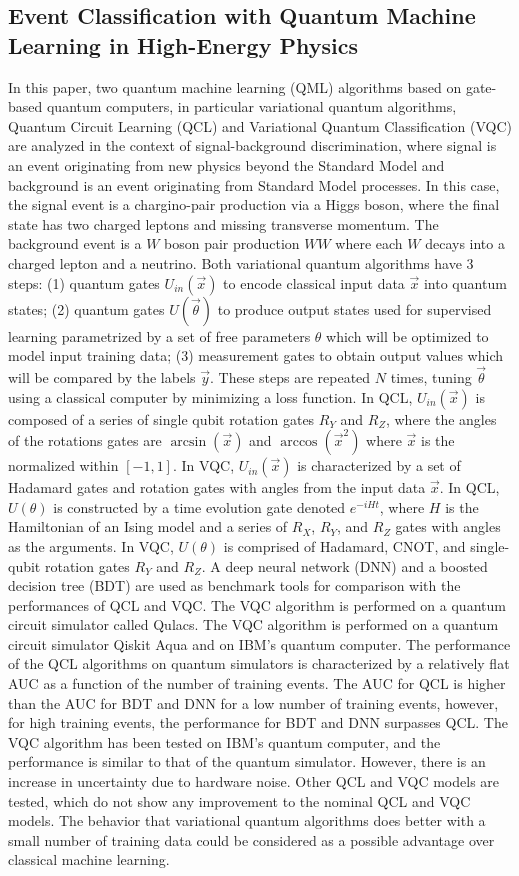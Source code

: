 \subsection{Event Classification with Quantum Machine Learning in High-Energy Physics~\cite{Terashi:2020wfi}}
In this paper, two quantum machine learning (QML) algorithms based on gate-based quantum computers, in particular variational quantum algorithms, Quantum Circuit Learning (QCL) and Variational Quantum Classification (VQC) are analyzed in the context of signal-background discrimination, where signal is an event originating from new physics beyond the Standard Model and background is an event originating from Standard Model processes. In this case, the signal event is a chargino-pair production via a Higgs boson, where the final state has two charged leptons and missing transverse momentum. The background event is a $W$ boson pair production $WW$ where each $W$ decays into a charged lepton and a neutrino. Both variational quantum algorithms have 3 steps: (1) quantum gates $U_{in}(\vec{x})$ to encode classical input data $\vec{x}$ into quantum states; (2) quantum gates $U(\vec{\theta})$ to produce output states used for supervised learning parametrized by a set of free parameters $\theta$ which will be optimized to model input training data; (3) measurement gates to obtain output values which will be compared by the labels $\vec{y}$. These steps are repeated $N$ times, tuning $\vec{\theta}$ using a classical computer by minimizing a loss function. In QCL, $U_{in}(\vec{x})$ is composed of a series of single qubit rotation gates $R_{Y}$ and $R_{Z}$, where the angles of the rotations gates are $\arcsin(\vec{x})$ and $\arccos(\vec{x}^2)$ where $\vec{x}$ is the normalized within $[-1,1]$. In VQC, $U_{in}(\vec{x})$ is characterized by a set of Hadamard gates and rotation gates with angles from the input data $\vec{x}$. In QCL, $U(\theta)$ is constructed by a time evolution gate denoted $e^{-iHt}$, where $H$ is the Hamiltonian of an Ising model and a series of $R_{X}$, $R_{Y}$, and $R_{Z}$ gates with angles as the arguments. In VQC, $U(\theta)$ is comprised of Hadamard, CNOT, and single-qubit rotation gates $R_{Y}$ and $R_{Z}$. A deep neural network (DNN) and a boosted decision tree (BDT) are used as benchmark tools for comparison with the performances of QCL and VQC. The VQC algorithm is performed on a quantum circuit simulator called Qulacs. The VQC algorithm is performed on a quantum circuit simulator Qiskit Aqua and on IBM's quantum computer. The performance of the QCL algorithms on quantum simulators is characterized by a relatively flat AUC as a function of the number of training events. The AUC for QCL is higher than the AUC for BDT and DNN for a low number of training events, however, for high training events, the performance for BDT and DNN surpasses QCL. The VQC algorithm has been tested on IBM's quantum computer, and the performance is similar to that of the quantum simulator. However, there is an increase in uncertainty due to hardware noise. Other QCL and VQC models are tested, which do not show any improvement to the nominal QCL and VQC models. The behavior that variational quantum algorithms does better with a small number of training data could be considered as a possible advantage over classical machine learning.
